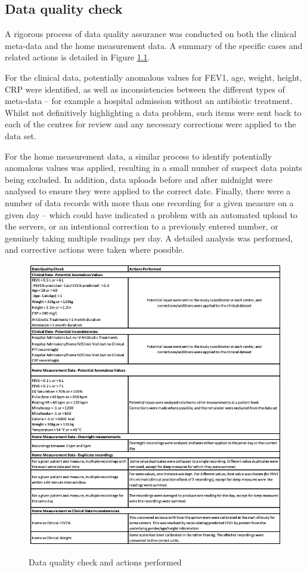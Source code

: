 \begin{appendices}
\chapter{Data quality check}
A rigorous process of data quality assurance was conducted on both the clinical meta-data and the home measurement data. A summary of the specific cases and related actions is detailed in Figure \ref{fig:dataqualitycheck}.

For the clinical data, potentially anomalous values for FEV1, age, weight, height, CRP were identified, as well as inconsistencies between the different types of meta-data – for example a hospital admission without an antibiotic treatment. Whilst not definitively highlighting a data problem, such items were sent back to each of the centres for review and any necessary corrections were applied to the data set.

For the home measurement data, a similar process to identify potentially anomalous values was applied, resulting in a small number of suspect data points being excluded. In addition, data uploads before and after midnight were analysed to ensure they were applied to the correct date. Finally, there were a number of data records with more than one recording for a given measure on a given day – which could have indicated a problem with an automated upload to the servers, or an intentional correction to a previously entered number, or genuinely taking multiple readings per day. A detailed analysis was performed, and corrective actions were taken where possible.

    \begin{figure}[!h]
    \caption{Data quality check and actions performed}
    \centering
    \includegraphics[width=150mm]{images/dataqualitycheck.png}
    \label{fig:dataqualitycheck}
    \end{figure}


\end{appendices}
